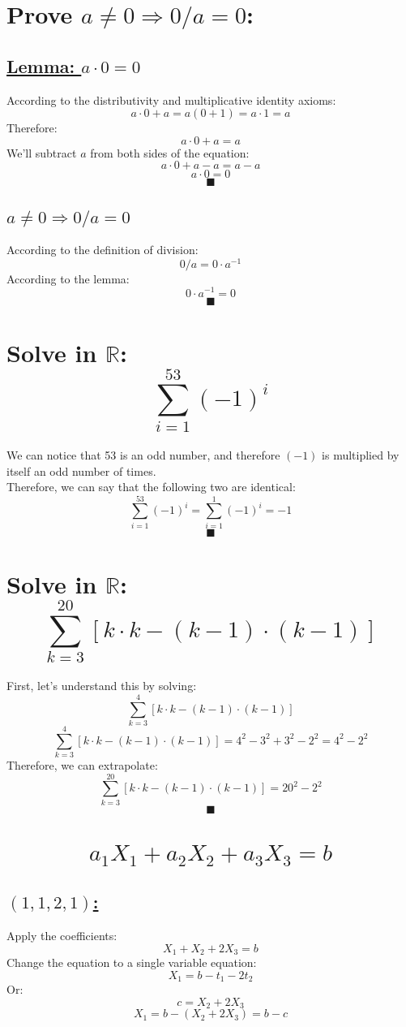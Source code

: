 \documentclass[a4paper, 12pt]{article}
\newcommand{\sub}[1]{\subsection{\underline{#1}}}
\newcommand{\?}{\stackrel{?}{=}}
\newcommand{\R}{\ensuremath{\mathbb{R}}}
\renewcommand{\qed}{$$\blacksquare$$}
\begin{document}
\setcounter{section}{29}
\section{Prove $a\neq{0} \Longrightarrow 0/a=0$:}
\sub{Lemma: $ a\cdot{0} = 0 $}
According to the distributivity and multiplicative identity axioms: $$ a\cdot{0}+a = a(0+1) = a\cdot{1} = a $$
Therefore: $$ a\cdot{0}+a = a $$
We'll subtract $a$ from both sides of the equation: $$ a\cdot{0} + a - a = a - a $$
$$ a\cdot{0} = 0 $$
\qed

\sub{$a\neq{0} \Longrightarrow 0/a=0$}
According to the definition of division: $$ 0/a = 0\cdot{a^{-1}} $$
According to the lemma: $$ 0\cdot{a^{-1}} = 0 $$
\qed

\setcounter{section}{36}
\section{Solve in \R:$$ \sum_{i=1}^{53}{(-1)^i} $$}
We can notice that 53 is an odd number, and therefore $(-1)$ is multiplied by itself an odd number of times.\\
Therefore, we can say that the following two are identical: $$ \sum_{i=1}^{53}{(-1)^i} = \sum_{i=1}^{1}{(-1)^i} = -1 $$
\qed\pagebreak

\section{Solve in \R:$$ \sum_{k=3}^{20}{[k\cdot{k}-(k-1)\cdot(k-1)]} $$}
First, let's understand this by solving: $$ \sum_{k=3}^{4}{[k\cdot{k}-(k-1)\cdot(k-1)]} $$
$$ \sum_{k=3}^{4}{[k\cdot{k}-(k-1)\cdot(k-1)]} = 4^2 -3^2 + 3^2 -2^2  = 4^2 - 2^2$$
Therefore, we can extrapolate:
$$ \sum_{k=3}^{20}{[k\cdot{k}-(k-1)\cdot(k-1)]} = 20^2 - 2^2$$
\qed

\setcounter{section}{48}
\section{$$ a_1X_1 +  a_2X_2+ a_3X_3 = b$$}
\sub{$(1,1,2,1)$:}
Apply the coefficients:
$$ X_1 +  X_2+ 2X_3 = b $$
Change the equation to a single variable equation:
$$ X_1 =b - t_1 - 2t_2 $$
Or:
$$ c = X_2+ 2X_3 $$
$$ X_1 = b - (X_2 + 2X_3) = b - c$$





\end{document}
